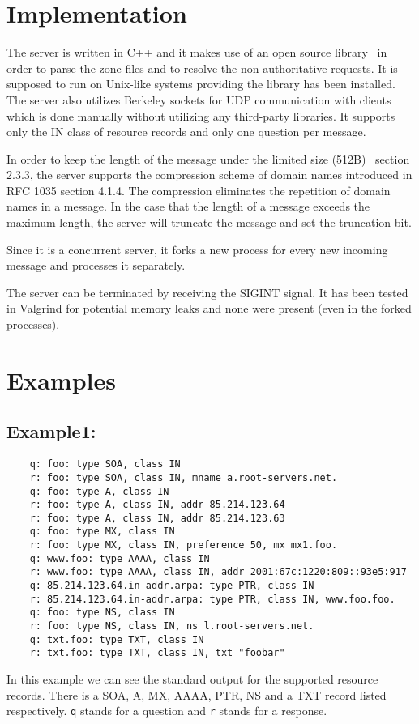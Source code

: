 \documentclass[12pt,a4paper,titlepage,final]{article}
\begin{document}
\section{Implementation} \label{sec:implementation}
The server is written in C++ and it makes use of an open source library~\cite{ldns} in order to parse the zone files and to resolve the non-authoritative requests. It is supposed to run on Unix-like systems providing the library has been installed. The server also utilizes Berkeley sockets for UDP communication with clients which is done manually without utilizing any third-party libraries. It supports only the IN class of resource records and only one question per message. 

In order to keep the length of the message under the limited size (512B)~\cite{rfc1035} section 2.3.3, the server supports the compression scheme of domain names introduced in RFC 1035 \cite{rfc1035} section 4.1.4. The compression eliminates the repetition of domain names in a message. In the case that the length of a message exceeds the maximum length, the server will truncate the message and set the truncation bit.

Since it is a concurrent server, it forks a new process for every new incoming message and processes it separately.

The server can be terminated by receiving the SIGINT signal. It has been tested in Valgrind for potential memory leaks and none were present (even in the forked processes).

\section{Examples} \label{sec:examples}
\subsection{Example1:} \label{subsec:ex1}
\begin{verbatim}
	q: foo: type SOA, class IN
	r: foo: type SOA, class IN, mname a.root-servers.net.
	q: foo: type A, class IN
	r: foo: type A, class IN, addr 85.214.123.64
	r: foo: type A, class IN, addr 85.214.123.63
	q: foo: type MX, class IN
	r: foo: type MX, class IN, preference 50, mx mx1.foo.
	q: www.foo: type AAAA, class IN
	r: www.foo: type AAAA, class IN, addr 2001:67c:1220:809::93e5:917
	q: 85.214.123.64.in-addr.arpa: type PTR, class IN
	r: 85.214.123.64.in-addr.arpa: type PTR, class IN, www.foo.foo.
	q: foo: type NS, class IN
	r: foo: type NS, class IN, ns l.root-servers.net.
	q: txt.foo: type TXT, class IN
	r: txt.foo: type TXT, class IN, txt "foobar"
\end{verbatim}
In this example we can see the standard output for the supported resource records. There is a SOA, A, MX, AAAA, PTR, NS and a TXT record listed respectively. \texttt{q} stands for a question and \texttt{r} stands for a response.
\end{document}
